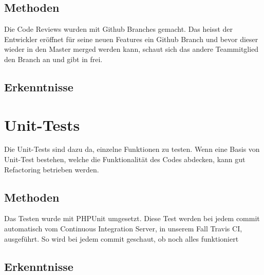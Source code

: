 \subsection{Methoden}
Die Code Reviews wurden mit Github Branches gemacht. Das heisst der Entwickler eröffnet für seine neuen Features ein Github Branch und bevor dieser wieder in den Master merged werden kann, schaut sich das andere Teammitglied den Branch an und gibt in frei.

\subsection{Erkenntnisse}

\section{Unit-Tests}
Die Unit-Tests sind dazu da, einzelne Funktionen zu testen. Wenn eine Basis von Unit-Test bestehen, welche die Funktionalität des Codes abdecken, kann gut Refactoring betrieben werden. 

\subsection{Methoden}
Das Testen wurde mit PHPUnit umgesetzt. Diese Test werden bei jedem commit automatisch vom Continuous Integration Server, in unserem Fall Travis CI, ausgeführt. So wird bei jedem commit geschaut, ob noch alles funktioniert

\subsection{Erkenntnisse}



